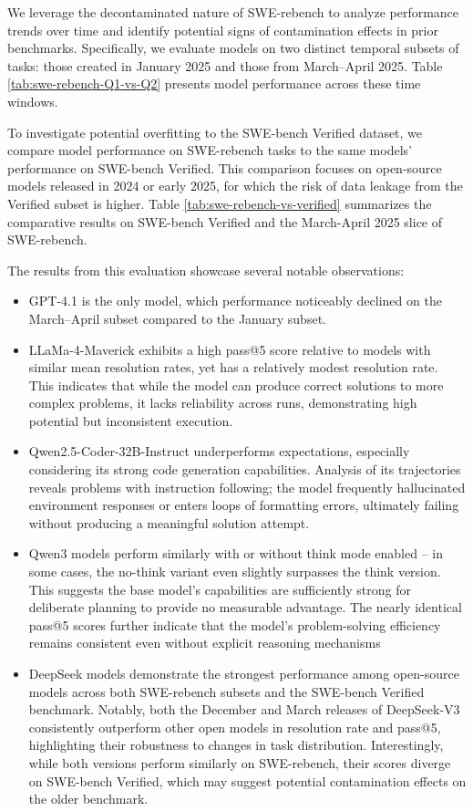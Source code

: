 \documentclass[dandb]{article}
\begin{document}
We leverage the decontaminated nature of SWE-rebench to analyze performance trends over time and identify potential signs of contamination effects in prior benchmarks. Specifically, we evaluate models on two distinct temporal subsets of tasks: those created in January 2025 and those from March–April 2025. Table \ref{tab:swe-rebench-Q1-vs-Q2} presents model performance across these time windows.

To investigate potential overfitting to the SWE-bench Verified dataset, we compare model performance on SWE-rebench tasks to the same models’ performance on SWE-bench Verified. This comparison focuses on open-source models released in 2024 or early 2025, for which the risk of data leakage from the Verified subset is higher. Table \ref{tab:swe-rebench-vs-verified} summarizes the comparative results on SWE-bench Verified and the March-April 2025 slice of SWE-rebench.

The results from this evaluation showcase several notable observations:

\begin{itemize}
    \item GPT-4.1 is the only model, which performance noticeably declined on the March–April subset compared to the January subset.
    \item LLaMa-4-Maverick exhibits a high pass@5 score relative to models with similar mean resolution rates, yet has a relatively modest resolution rate. This indicates that while the model can produce correct solutions to more complex problems, it lacks reliability across runs, demonstrating high potential but inconsistent execution.
    \item Qwen2.5-Coder-32B-Instruct underperforms expectations, especially considering its strong code generation capabilities. Analysis of its trajectories reveals problems with instruction following; the model frequently hallucinated environment responses or enters loops of formatting errors, ultimately failing without producing a meaningful solution attempt.
    \item Qwen3 models perform similarly with or without think mode enabled -- in some cases, the no-think variant even slightly surpasses the think version. This suggests the base model’s capabilities are sufficiently strong for deliberate planning to provide no measurable advantage. The nearly identical pass@5 scores further indicate that the model’s problem-solving efficiency remains consistent even without explicit reasoning mechanisms
    \item DeepSeek models demonstrate the strongest performance among open-source models across both SWE-rebench subsets and the SWE-bench Verified benchmark. Notably, both the December and March releases of DeepSeek-V3 consistently outperform other open models in resolution rate and pass@5, highlighting their robustness to changes in task distribution. Interestingly, while both versions perform similarly on SWE-rebench, their scores diverge on SWE-bench Verified, which may suggest potential contamination effects on the older benchmark.
\end{itemize}
\end{document}

